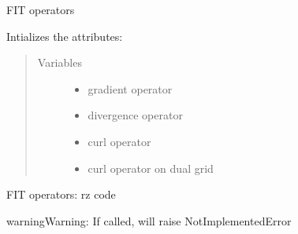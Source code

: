 \documentclass[letterpaper,10pt,english]{sphinxmanual}
\begin{document}
\begin{fulllineitems}
\begin{fulllineitems}
\end{fulllineitems}


\begin{fulllineitems}
\label{\detokenize{FIT:FIT.FIT.createOperators}}
FIT operators

Intializes the attributes:
\begin{quote}\begin{description}
\item[{Variables}] \leavevmode\begin{itemize}
\item {} 
 \textendash{} gradient operator

\item {} 
 \textendash{} divergence operator

\item {} 
 \textendash{} curl operator

\item {} 
 \textendash{} curl operator on dual grid

\end{itemize}

\end{description}\end{quote}

\end{fulllineitems}


\begin{fulllineitems}
\label{\detokenize{FIT:FIT.FIT.createOperatorsBOR}}
FIT operators: rz code

\begin{sphinxadmonition}{warning}{Warning:}
If called, will raise NotImplementedError
\end{sphinxadmonition}

\end{fulllineitems}



\end{fulllineitems}
\end{document}
